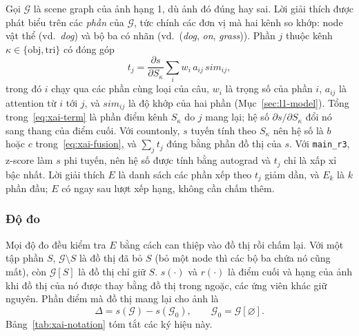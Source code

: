 Gọi $\mathcal{G}$ là scene graph của ảnh hạng 1, dù ảnh đó đúng hay sai. Lời giải thích được phát biểu trên các \emph{phần}
của $\mathcal{G}$, tức chính các đơn vị mà hai kênh so khớp: node vật thể (vd.\ \emph{dog}) và bộ ba có nhãn (vd.\
(\emph{dog}, \emph{on}, \emph{grass})). Phần $j$ thuộc kênh $\kappa\in\{\text{obj},\text{tri}\}$ có đóng góp
\begin{equation}
  t_j=\frac{\partial s}{\partial S_{\kappa}}\sum_i w_i\,a_{ij}\,\mathit{sim}_{ij},
  \label{eq:xai-term}
\end{equation}
trong đó $i$ chạy qua các phần cùng loại của câu, $w_i$ là trọng số của phần $i$, $a_{ij}$ là attention từ $i$ tới $j$, và
$\mathit{sim}_{ij}$ là độ khớp của hai phần (Mục~\ref{sec:l1-model}). Tổng trong~\eqref{eq:xai-term} là phần điểm kênh
$S_\kappa$ do $j$ mang lại; hệ số $\partial s/\partial S_\kappa$ đổi nó sang thang của điểm cuối. Với countonly, $s$ tuyến
tính theo $S_\kappa$ nên hệ số là $b$ hoặc $c$ trong~\eqref{eq:xai-fusion}, và $\sum_j t_j$ đúng bằng phần đồ thị của $s$.
Với \texttt{main\_r3}, z-score làm $s$ phi tuyến, nên hệ số được tính bằng autograd và $t_j$ chỉ là xấp xỉ bậc nhất.
Lời giải thích $E$ là danh sách các phần xếp theo $t_j$ giảm dần, và $E_k$ là $k$ phần đầu; $E$ có ngay sau lượt xếp hạng,
không cần chấm thêm.

\subsubsection{Độ đo}\label{sec:xai-metrics}
Mọi độ đo đều kiểm tra $E$ bằng cách can thiệp vào đồ thị rồi chấm lại. Với một tập phần $S$, $\mathcal{G}\setminus S$ là đồ thị đã bỏ $S$
(bỏ một node thì các bộ ba chứa nó cũng mất), còn $\mathcal{G}[S]$ là đồ thị chỉ giữ $S$. $s(\cdot)$ và $r(\cdot)$ là điểm
cuối và hạng của ảnh khi đồ thị của nó được thay bằng đồ thị trong ngoặc, các ứng viên khác giữ nguyên. Phần điểm mà đồ thị
mang lại cho ảnh là
\begin{equation}
  \Delta=s(\mathcal{G})-s(\mathcal{G}_0),\qquad \mathcal{G}_0=\mathcal{G}[\varnothing].
  \label{eq:xai-delta}
\end{equation}
Bảng~\ref{tab:xai-notation} tóm tắt các ký hiệu này.

